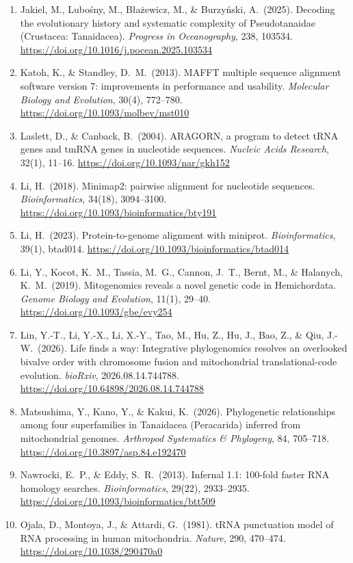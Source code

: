 \documentclass[11pt, a4paper]{article}
\begin{document}
\begin{enumerate}[label={}, leftmargin=1.5em, itemindent=-1.5em, itemsep=0.3em, parsep=0pt]
\item Jakiel, M., Lubośny, M., Błażewicz, M., \& Burzyński, A.\ (2025). Decoding the evolutionary history and systematic complexity of Pseudotanaidae (Crustacea: Tanaidacea). \textit{Progress in Oceanography}, 238, 103534. \url{https://doi.org/10.1016/j.pocean.2025.103534}
\item Katoh, K., \& Standley, D.\ M.\ (2013). MAFFT multiple sequence alignment software version 7: improvements in performance and usability. \textit{Molecular Biology and Evolution}, 30(4), 772--780. \url{https://doi.org/10.1093/molbev/mst010}
\item Laslett, D., \& Canback, B.\ (2004). ARAGORN, a program to detect tRNA genes and tmRNA genes in nucleotide sequences. \textit{Nucleic Acids Research}, 32(1), 11--16. \url{https://doi.org/10.1093/nar/gkh152}
\item Li, H.\ (2018). Minimap2: pairwise alignment for nucleotide sequences. \textit{Bioinformatics}, 34(18), 3094--3100. \url{https://doi.org/10.1093/bioinformatics/bty191}
\item Li, H.\ (2023). Protein-to-genome alignment with miniprot. \textit{Bioinformatics}, 39(1), btad014. \url{https://doi.org/10.1093/bioinformatics/btad014}
\item Li, Y., Kocot, K.\ M., Tassia, M.\ G., Cannon, J.\ T., Bernt, M., \& Halanych, K.\ M.\ (2019). Mitogenomics reveals a novel genetic code in Hemichordata. \textit{Genome Biology and Evolution}, 11(1), 29--40. \url{https://doi.org/10.1093/gbe/evy254}
\item Lin, Y.-T., Li, Y.-X., Li, X.-Y., Tao, M., Hu, Z., Hu, J., Bao, Z., \& Qiu, J.-W.\ (2026). Life finds a way: Integrative phylogenomics resolves an overlooked bivalve order with chromosome fusion and mitochondrial translational-code evolution. \textit{bioRxiv}, 2026.08.14.744788. \url{https://doi.org/10.64898/2026.08.14.744788}
\item Matsushima, Y., Kano, Y., \& Kakui, K.\ (2026). Phylogenetic relationships among four superfamilies in Tanaidacea (Peracarida) inferred from mitochondrial genomes. \textit{Arthropod Systematics \& Phylogeny}, 84, 705--718. \url{https://doi.org/10.3897/asp.84.e192470}
\item Nawrocki, E.\ P., \& Eddy, S.\ R.\ (2013). Infernal 1.1: 100-fold faster RNA homology searches. \textit{Bioinformatics}, 29(22), 2933--2935. \url{https://doi.org/10.1093/bioinformatics/btt509}
\item Ojala, D., Montoya, J., \& Attardi, G.\ (1981). tRNA punctuation model of RNA processing in human mitochondria. \textit{Nature}, 290, 470--474. \url{https://doi.org/10.1038/290470a0}

\end{enumerate}
\end{document}
